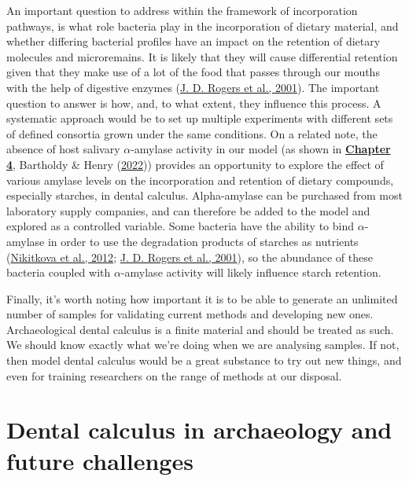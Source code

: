 \documentclass[
  letterpaper,
]{book}
\begin{document}
An important question to address within the framework of incorporation
pathways, is what role bacteria play in the incorporation of dietary
material, and whether differing bacterial profiles have an impact on the
retention of dietary molecules and microremains. It is likely that they
will cause differential retention given that they make use of a lot of
the food that passes through our mouths with the help of digestive
enzymes (\protect\hyperlink{ref-rogersRoleStreptococcus2001}{J. D.
Rogers et al., 2001}). The important question to answer is how, and, to
what extent, they influence this process. A systematic approach would be
to set up multiple experiments with different sets of defined consortia
grown under the same conditions. On a related note, the absence of host
salivary \(\alpha\)-amylase activity in our model (as shown in
\protect\hyperlink{byoc-starch}{\textbf{Chapter 4}}, Bartholdy \& Henry
(\protect\hyperlink{ref-bartholdyInvestigatingBiases2022}{2022}))
provides an opportunity to explore the effect of various amylase levels
on the incorporation and retention of dietary compounds, especially
starches, in dental calculus. Alpha-amylase can be purchased from most
laboratory supply companies, and can therefore be added to the model and
explored as a controlled variable. Some bacteria have the ability to
bind \(\alpha\)-amylase in order to use the degradation products of
starches as nutrients
(\protect\hyperlink{ref-nikitkovaEffectStarch2012}{Nikitkova et al.,
2012}; \protect\hyperlink{ref-rogersRoleStreptococcus2001}{J. D. Rogers
et al., 2001}), so the abundance of these bacteria coupled with
\(\alpha\)-amylase activity will likely influence starch retention.

Finally, it's worth noting how important it is to be able to generate an
unlimited number of samples for validating current methods and
developing new ones. Archaeological dental calculus is a finite material
and should be treated as such. We should know exactly what we're doing
when we are analysing samples. If not, then model dental calculus would
be a great substance to try out new things, and even for training
researchers on the range of methods at our disposal.

\hypertarget{dental-calculus-in-archaeology-and-future-challenges}{%
\section{Dental calculus in archaeology and future
challenges}\label{dental-calculus-in-archaeology-and-future-challenges}}
\end{document}
